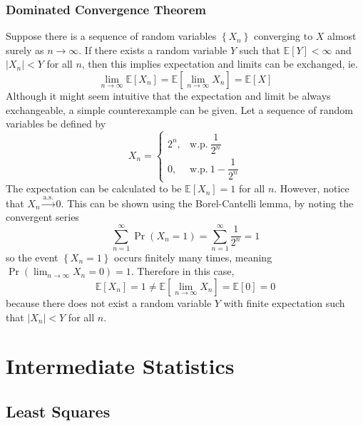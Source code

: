 \documentclass[11pt]{report} %
\begin{document}
\subsection{Dominated Convergence Theorem}

Suppose there is a sequence of random variables $\left\{X_{n}\right\}$ converging to $X$ almost surely as $n\to\infty$. If there exists a random variable $Y$ such that $\mathbb{E}\left[Y\right] < \infty$ and $\left|X_{n}\right| < Y$ for all $n$, then this implies expectation and limits can be exchanged, ie.
\begin{equation}
\lim_{n\to\infty}\mathbb{E}\left[X_{n}\right] = \mathbb{E}\left[\lim_{n\to\infty}X_{n}\right] = \mathbb{E}\left[X\right]
\end{equation}
Although it might seem intuitive that the expectation and limit be always exchangeable, a simple counterexample can be given. Let a sequence of random variables be defined by
\begin{equation}
X_{n} = \begin{cases} 2^{n}, & \mathrm{w.p.}\ \dfrac{1}{2^{n}} \\ 0, & \mathrm{w.p.}\ 1 - \dfrac{1}{2^{n}}\end{cases}
\end{equation}
The expectation can be calculated to be $\mathbb{E}\left[X_{n}\right] = 1$ for all $n$. However, notice that $X_{n} \overset{\mathrm{a.s.}}{\to} 0$. This can be shown using the Borel-Cantelli lemma, by noting the convergent series
\begin{equation}
\sum_{n = 1}^{\infty}\operatorname{Pr}\left(X_{n} = 1\right) = \sum_{n = 1}^{\infty}\dfrac{1}{2^{n}} = 1
\end{equation}
so the event $\left\{X_{n} = 1\right\}$ occurs finitely many times, meaning $\operatorname{Pr}\left(\lim_{n\to\infty}X_{n} = 0\right) = 1$. Therefore in this case,
\begin{equation}
\mathbb{E}\left[X_{n}\right] = 1 \neq \mathbb{E}\left[\lim_{n\to\infty}X_{n}\right] = \mathbb{E}\left[0\right] = 0
\end{equation}
because there does not exist a random variable $Y$ with finite expectation such that $\left|X_{n}\right| < Y$ for all $n$.

\chapter{Intermediate Statistics}

\section{Least Squares}
\end{document}
